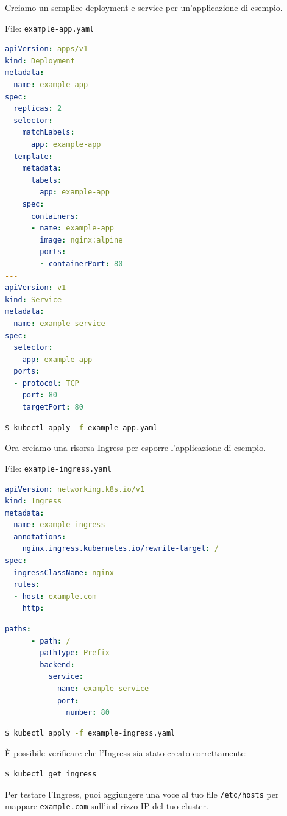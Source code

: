 \documentclass[11pt, a4paper]{article}
\begin{document}
Creiamo un semplice deployment e service per un'applicazione di esempio.

File: \texttt{example-app.yaml}


\begin{lstlisting}[language=yaml]
apiVersion: apps/v1
kind: Deployment
metadata:
  name: example-app
spec:
  replicas: 2
  selector:
    matchLabels:
      app: example-app
  template:
    metadata:
      labels:
        app: example-app
    spec:
      containers:
      - name: example-app
        image: nginx:alpine
        ports:
        - containerPort: 80
---
apiVersion: v1
kind: Service
metadata:
  name: example-service
spec:
  selector:
    app: example-app
  ports:
  - protocol: TCP
    port: 80
    targetPort: 80
\end{lstlisting}

\begin{lstlisting}[language=bash]
$ kubectl apply -f example-app.yaml
\end{lstlisting}

Ora creiamo una risorsa Ingress per esporre l'applicazione di esempio.

File: \texttt{example-ingress.yaml}

\begin{lstlisting}[language=yaml]
apiVersion: networking.k8s.io/v1
kind: Ingress
metadata:
  name: example-ingress
  annotations:
    nginx.ingress.kubernetes.io/rewrite-target: /
spec:
  ingressClassName: nginx
  rules:
  - host: example.com
    http:
\end{lstlisting}


\begin{lstlisting}[language=yaml]
      paths:
      - path: /
        pathType: Prefix
        backend:
          service:
            name: example-service
            port:
              number: 80
\end{lstlisting}

\begin{lstlisting}[language=bash]
$ kubectl apply -f example-ingress.yaml
\end{lstlisting}

È possibile verificare che l'Ingress sia stato creato correttamente:
\begin{lstlisting}[language=bash]
$ kubectl get ingress
\end{lstlisting}

Per testare l'Ingress, puoi aggiungere una voce al tuo file \texttt{/etc/hosts} per mappare \texttt{example.com} sull'indirizzo IP del tuo cluster.
\end{document}
